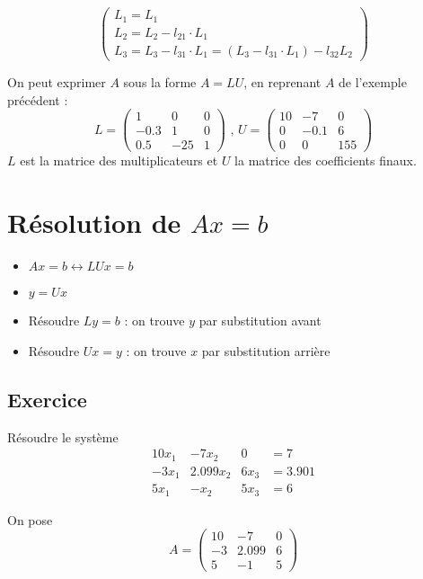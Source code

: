 \documentclass[a4paper,9pt]{extarticle}
\begin{document}
$$
\begin{pmatrix}
L_1  = L_1\\
L_2  = L_2 - l_{21}\cdot L_1\\
L_3 = L_3 - l_{31}\cdot L_1 = (L_3 - l_{31}\cdot L_1) - l_{32}L_2
\end{pmatrix}
$$

On peut exprimer $A$ sous la forme $A=LU$, en reprenant $A$ de l'exemple précédent :
$$
L = 
\begin{pmatrix}
1 & 0 & 0 \\
-0.3 & 1 & 0 \\
0.5 & -25 & 1
\end{pmatrix}
\text{ , }
U = 
\begin{pmatrix}
10 & -7 & 0 \\
0 & -0.1 & 6 \\
0 & 0 & 155
\end{pmatrix}
$$
$L$ est la matrice des multiplicateurs et $U$ la matrice des coefficients finaux.

\section{Résolution de $Ax=b$}

\begin{itemize}
    \item $Ax = b \longleftrightarrow LUx=b$
    \item $y = Ux$
    \item Résoudre $Ly = b$ : on trouve $y$ par substitution avant
    \item Résoudre $Ux = y$ : on trouve $x$ par substitution arrière
\end{itemize}

\subsection{Exercice}
Résoudre le système
$$
\begin{array}{cccc}
10x_1 & -7x_2 & 0 & =7 \\ 
-3x_1 & 2.099x_2 & 6x_3 & =3.901 \\ 
5x_1 & -x_2 & 5x_3 & =6
\end{array} 
$$

On pose
$$
A = 
\begin{pmatrix}
10 & -7 & 0 \\
-3 & 2.099 & 6 \\
5 & -1 & 5
\end{pmatrix}
$$
\end{document}
